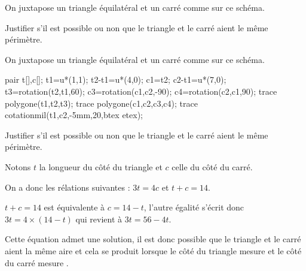 \begin{exercice*}
    On juxtapose un triangle équilatéral et un carré comme sur ce schéma.


    Justifier s'il est possible ou non que le triangle et le carré aient le même périmètre.
\end{exercice*}
\begin{corrige}
        On juxtapose un triangle équilatéral et un carré comme sur ce schéma.

    \begin{Geometrie}
        pair t[],c[];
        t1=u*(1,1);
        t2-t1=u*(4,0);
        c1=t2;
        c2-t1=u*(7,0);
        t3=rotation(t2,t1,60);
        c3=rotation(c1,c2,-90);
        c4=rotation(c2,c1,90);
        trace polygone(t1,t2,t3);
        trace polygone(c1,c2,c3,c4);
        trace cotationmil(t1,c2,-5mm,20,btex  etex);
    \end{Geometrie}

    Justifier s'il est possible ou non que le triangle et le carré aient le même périmètre.

    {\color{red} Notons $t$ la longueur du côté du triangle et $c$ celle du côté du carré.

    On a donc les rélations suivantes : $3t=4c$ et $t+c=14$.

    $t+c=14$ est équivalente à $c=14-t$, l'autre égalité s'écrit donc $3t=4\times(14-t)$ qui revient à $3t=56-4t$.


    Cette équation admet une solution, il est donc possible que le triangle et le carré aient la même aire et cela
    se produit lorsque le côté du triangle mesure  et le côté du carré mesure .
    }
\end{corrige}

